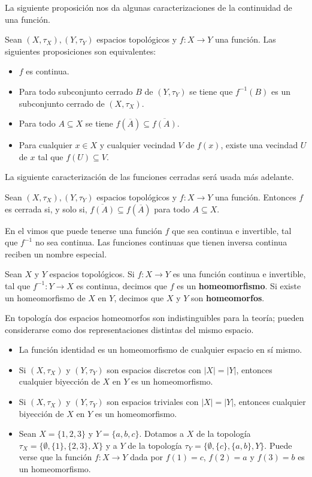 La siguiente proposición nos da algunas caracterizaciones de la continuidad de una función.
\begin{Prop}\label{Prop:Caracterizacion_continuidad}
   Sean $(X,\tau_X), (Y,\tau_Y)$ espacios topológicos y $f:X\to Y$ una función. Las siguientes proposiciones son equivalentes:
   \begin{itemize}
      \item[1.] $f$ es continua.
      \item[2.] Para todo subconjunto cerrado $B$ de $(Y,\tau_Y)$ se tiene que $f^{-1}(B)$ es un subconjunto cerrado de $(X,\tau_X)$.
      \item[3.] Para todo $A\subseteq X$ se tiene $f(\overline{A})\subseteq\overline{f(A)}$.
      \item[4.] Para cualquier $x\in X$ y cualquier vecindad $V$ de $f(x)$, existe una vecindad $U$ de $x$ tal que $f(U)\subseteq V$.
   \end{itemize}
\end{Prop}
La siguiente caracterización de las funciones cerradas será usada más adelante.
\begin{Prop}
   Sean $(X,\tau_X), (Y,\tau_Y)$ espacios topológicos y $f:X\to Y$ una función. Entonces $f$ es cerrada si, y solo si, $\overline{f(A)}\subseteq f(\overline{A})$ para todo $A\subseteq X$. 
\end{Prop}
En el  vimos que puede tenerse una función $f$ que sea continua e invertible, tal que $f^{-1}$ no sea continua. Las funciones continuas que tienen inversa continua reciben un nombre especial.
\begin{Def}
   Sean $X$ y $Y$ espacios topológicos. Si $f:X\to Y$ es una función continua e invertible, tal que $f^{-1}:Y\to X$ es continua, decimos que $f$ es un \textbf{homeomorfismo}. Si existe un homeomorfismo de $X$ en $Y$, decimos que $X$ y $Y$ son \textbf{homeomorfos}. 
\end{Def}
En topología dos espacios homeomorfos son indistinguibles para la teoría; pueden considerarse como dos representaciones distintas del mismo espacio.
\begin{Ejm}\label{Ejm:homeomorfismos}
   \phantom{o}
   \begin{itemize}
      \item La función identidad es un homeomorfismo de cualquier espacio en sí mismo.
      \item Si $(X,\tau_X)$ y $(Y,\tau_Y)$ son espacios discretos con $|X|=|Y|$, entonces cualquier biyección de $X$ en $Y$ es un homeomorfismo.
      \item Si $(X,\tau_X)$ y $(Y,\tau_Y)$ son espacios triviales con $|X|=|Y|$, entonces cualquier biyección de $X$ en $Y$ es un homeomorfismo.
      \item Sean $X = \{1, 2, 3\}$ y $Y = \{a, b, c\}$. Dotamos a $X$ de la topología $\tau_X = \{\emptyset, \{1\},\allowbreak \{2, 3\},\allowbreak X\}$ y a $Y$ de la topología $\tau_Y = \{\emptyset, \{c\}, \{a, b\}, Y\}$. Puede verse que la función $f: X \to Y$ dada por $f(1) = c$, $f(2) = a$ y $f(3) = b$ es un homeomorfismo.
   \end{itemize}
\end{Ejm}
